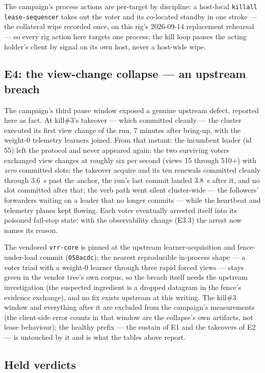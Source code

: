 \documentclass[10pt,journal,letterpaper]{IEEEtran}
\newcommand{\code}[1]{\texttt{\small #1}}
\begin{document}
The campaign's process actions are per-target by discipline: a
host-local \code{killall lease-sequencer} takes out the voter and its
co-located standby in one stroke --- the collateral wipe recorded once,
on this rig's 2026-09-14 replacement rehearsal --- so every rig action
here targets one process; the kill loop pauses the acting holder's
client by signal on its own host, never a host-wide wipe.

\subsection{E4: the view-change collapse --- an upstream breach}

The campaign's third pause window exposed a genuine upstream defect,
reported here as fact. At kill\#3's takeover --- which committed
cleanly --- the cluster executed its first view change of the run, 7
minutes after bring-up, with the weight-0 telemetry learners joined.
From that instant: the incumbent leader (id 55) left the protocol and
never appeared again; the two surviving voters exchanged view changes
at roughly six per second (views 15 through 510+) with \emph{zero}
committed slots; the takeover acquire and its ten renewals committed
cleanly through 3.6~s past the anchor, the run's last commit landed
3.8~s after it, and no slot committed after that; the verb path
went silent cluster-wide --- the followers' forwarders waiting on a
leader that no longer commits --- while the heartbeat and telemetry
planes kept flowing. Each voter eventually arrested itself into its
poisoned fail-stop state; with the observability change (E3.3) the
arrest now names its reason.

The vendored \code{vrr-core} is pinned at the upstream
learner-acquisition and fence-under-load commit
(\code{058acdc}); the nearest reproducible in-process shape --- a
voter triad with a weight-0 learner through three rapid forced views
--- stays green in the vendor tree's own corpus, so the breach itself
needs the upstream investigation (the suspected ingredient is a
dropped datagram in the fence's evidence exchange), and no fix exists
upstream at this writing. The kill\#3 window and everything after it
are excluded from the campaign's measurements (the client-side error
counts in that window are the collapse's own artifacts, not lease
behaviour); the healthy prefix --- the sustain of E1 and the takeovers
of E2 --- is untouched by it and is what the tables above report.

\subsection{Held verdicts}
\end{document}
